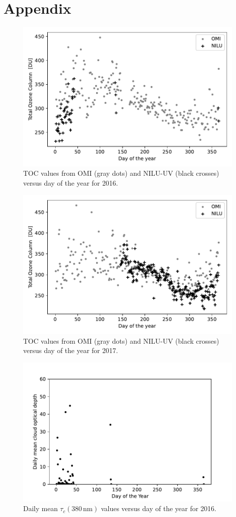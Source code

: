 \documentclass{optica-article}
\begin{document}
\section{Appendix}
\label{sec-appendix}

\begin{figure}[H]
	\centering
	\includegraphics[width=0.7\linewidth]{OMI_L3_NILU_O3_2016}
	\caption{TOC values from OMI (gray dots) and NILU-UV (black crosses) versus day of the year for 2016.}
	\label{fig:omil3niluo32016}
\end{figure}


\begin{figure}[H]
	\centering
	\includegraphics[width=0.7\linewidth]{OMI_L3_NILU_O3_2017}
	\caption{TOC values from OMI (gray dots) and NILU-UV (black crosses) versus day of the year for 2017.}
	\label{fig:omil3niluo32017}
\end{figure}

\begin{figure}[H]
	\centering
	\includegraphics[width=0.7\linewidth]{COD_vs_DOY_2016}
	\caption{Daily mean $\tau_c{\scriptstyle(380 \, \text{nm})}$ values versus day of the year for 2016.}
	\label{fig:codvsdoy2016}
\end{figure}
\end{document}
